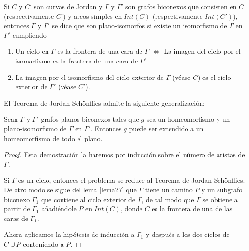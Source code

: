 \begin{definition}
	Si $C$ y $C'$ son curvas de Jordan y $\Gamma$ y $\Gamma'$ son grafos biconexos que consisten en $C$ (respectivamente $C'$) y arcos   simples en $\overline{Int}(C)$ (respectivamente $\overline{Int}(C')$), entonces $\Gamma$ y $\Gamma'$ se dice que son plano-isomorfos si existe un isomorfismo de $\Gamma$ en $\Gamma'$ cumpliendo 
\begin{enumerate}
	\item Un ciclo en $\Gamma$ es la frontera de una cara de $\Gamma$     $\iff$ La imagen del ciclo por el isomorfismo es la frontera de una cara de $\Gamma'$.
	\item La imagen por el isomorfismo del ciclo exterior de $\Gamma$ (véase $C$) es el ciclo exterior de $\Gamma'$ (véase $C'$).
\end{enumerate}	
\end{definition}
El Teorema de Jordan-Schönflies admite la siguiente generalización:
\begin{theorem}\label{teorema33}
	Sean $\Gamma$ y $\Gamma'$ grafos planos biconexos tales que $g$ sea un homeomorfismo y un plano-isomorfismo de $\Gamma$ en $\Gamma'$. Entonces $g$ puede ser extendido a un homeomorfismo de todo el plano.
\end{theorem}

\begin{proof}
	Esta demostración la haremos por inducción sobre el número de aristas de $\Gamma$.

	Si $\Gamma$ es un ciclo, entonces el problema se reduce al Teorema de Jordan-Schönflies. De otro modo se sigue del lema \ref{lema27} que $\Gamma$ tiene un camino $P$ y un subgrafo biconexo $\Gamma_1$ que contiene al ciclo exterior de $\Gamma$, de tal modo que $\Gamma$ se obtiene a partir de $\Gamma_1$ añadiéndole $P$ en $\overline{Int}(C)$, donde $C$ es la frontera de una de las caras de $\Gamma_1$.

	Ahora aplicamos la hipótesis de inducción a $\Gamma_1$ y después a los dos ciclos de $C \cup P$ conteniendo a $P$.
\end{proof}